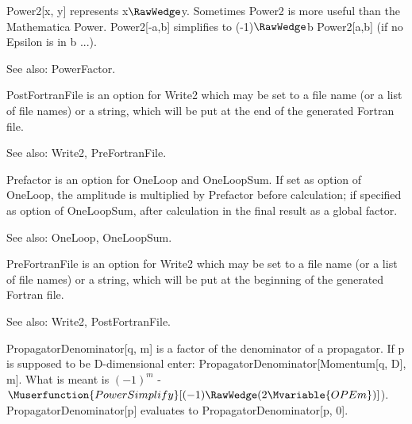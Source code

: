




Power2[x, y] represents x\(\RawWedge\)y. { }Sometimes Power2 is more useful than the Mathematica Power. Power2[-a,b] simplifies to
  (-1)\(\RawWedge\)b Power2[a,b] (if no Epsilon is in b ...).

See also:  PowerFactor.








PostFortranFile is an option for Write2 which may be set to a file name (or a list of file names) or a string, { }which will be put at
  the end of the generated Fortran file.

See also:  Write2, PreFortranFile.



Prefactor is an option for OneLoop and OneLoopSum. If set as option of OneLoop, the amplitude is multiplied by Prefactor before
  calculation; if specified as option of OneLoopSum, after calculation in the final result as a global factor.

See also:  OneLoop, OneLoopSum.



PreFortranFile is an option for Write2 which may be set to a file name (or a list of file names) or a string, which will be put at the
  beginning of the generated Fortran file.

See also:  Write2, PostFortranFile.



PropagatorDenominator[q, m] is a factor of the denominator of a propagator. If p is supposed to be D-dimensional enter:
  PropagatorDenominator[Momentum[q, D], m]. What is meant is \({{(-1)}^m}\) - \(\Muserfunction{PowerSimplify}[(-1)\RawWedge (2\Mvariable{OPEm})]\)).
PropagatorDenominator[p] evaluates to PropagatorDenominator[p, 0].

